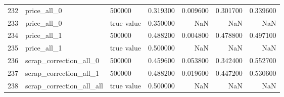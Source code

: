 \begin{tabular}{lllrrrr}
232 & price_all_0 & 500000 & 0.319300 & 0.009600 & 0.301700 & 0.339600 \\
233 & price_all_0 & true value & 0.350000 & NaN & NaN & NaN \\
234 & price_all_1 & 500000 & 0.488200 & 0.004800 & 0.478800 & 0.497100 \\
235 & price_all_1 & true value & 0.500000 & NaN & NaN & NaN \\
236 & scrap_correction_all_0 & 500000 & 0.459600 & 0.053800 & 0.342400 & 0.552700 \\
237 & scrap_correction_all_1 & 500000 & 0.488200 & 0.019600 & 0.447200 & 0.530600 \\
238 & scrap_correction_all_all & true value & 0.500000 & NaN & NaN & NaN \\
\bottomrule
\end{tabular}
